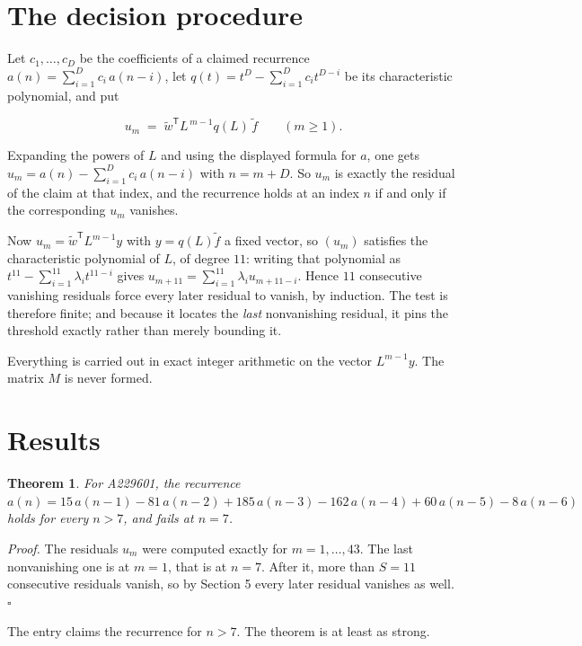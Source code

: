 \documentclass[11pt]{article}
\newtheorem{theorem}{Theorem}
\theoremstyle{definition}
\begin{document}
\section{The decision procedure}

Let $c_1,\dots,c_D$ be the coefficients of a claimed recurrence $a(n) = \sum_{i=1}^{D} c_i\,a(n-i)$, let $q(t) = t^{D} - \sum_{i=1}^{D} c_i t^{D-i}$ be its characteristic polynomial, and put

\[u_m \;=\; \tilde w^{\mathsf T} L^{\,m-1} q(L)\,\tilde f \qquad (m \ge 1).\]

Expanding the powers of $L$ and using the displayed formula for $a$, one gets $u_m = a(n) - \sum_{i=1}^{D} c_i\,a(n-i)$ with $n = m + D$. So $u_m$ is exactly the residual of the claim at that index, and the recurrence holds at an index $n$ if and only if the corresponding $u_m$ vanishes.

Now $u_m = \tilde w^{\mathsf T} L^{m-1} y$ with $y = q(L)\tilde f$ a fixed vector, so $(u_m)$ satisfies the characteristic polynomial of $L$, of degree $11$: writing that polynomial as $t^{11} - \sum_{i=1}^{11} \lambda_i t^{11-i}$ gives $u_{m+11} = \sum_{i=1}^{11} \lambda_i u_{m+11-i}$. Hence $11$ consecutive vanishing residuals force every later residual to vanish, by induction. The test is therefore finite; and because it locates the {\itshape last} nonvanishing residual, it pins the threshold exactly rather than merely bounding it.

Everything is carried out in exact integer arithmetic on the vector $L^{m-1}y$. The matrix $M$ is never formed.

\section{Results}

\begin{theorem} For A229601, the recurrence $a(n) = 15\,a(n-1) - 81\,a(n-2) + 185\,a(n-3) - 162\,a(n-4) + 60\,a(n-5) - 8\,a(n-6)$ holds for every $n > 7$, and fails at $n = 7$.\end{theorem}

{\itshape Proof.} The residuals $u_m$ were computed exactly for $m = 1,\dots,43$. The last nonvanishing one is at $m = 1$, that is at $n = 7$. After it, more than $S = 11$ consecutive residuals vanish, so by Section 5 every later residual vanishes as well. $\square$

The entry claims the recurrence for $n > 7$. The theorem is at least as strong.
\end{document}
